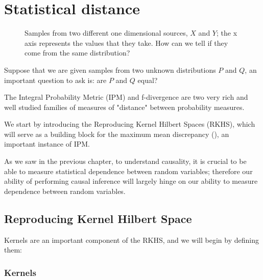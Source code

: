 \chapter{Statistical distance}





\begin{figure}[H]
    \captionsetup[subfigure]{labelformat=empty}
    \centering
    \qquad
    \caption{Samples from two different one dimensional sources, $X$ and $Y$; the x 
    axis represents the values that they take. 
    How can we tell if they come from the same distribution?}
    \label{fig:scatter_dist_questions}%
\end{figure}


Suppose that we are given samples from two unknown distributions $P$ and $Q$, an 
important question to ask is: are $P$ and $Q$ equal?


The Integral Probability Metric (IPM) and f-divergence are two very rich and well studied
families of measures of "distance" between probability measures.

We start by introducing the Reproducing Kernel Hilbert Spaces (RKHS), which will serve as a 
building block for the maximum mean discrepancy (\cite{TwoSampleTestGrettonBernhard}), an important instance of IPM.

As we saw in the previous chapter, to understand causality, it is crucial to be able to 
measure statistical dependence between random variables; therefore our ability of 
performing causal inference will largely hinge on our ability to measure dependence 
between random variables. 

\newpage
\section{Reproducing Kernel Hilbert Space}

Kernels are an important component of the RKHS, and we will begin by defining them:

\subsection{Kernels}

